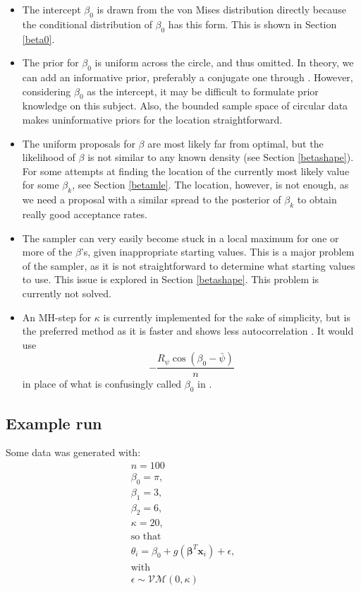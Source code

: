 \documentclass{article}\usepackage[]{graphicx}\usepackage[]{color}
\begin{document}
\begin{itemize}
\item The intercept $\beta_0$ is drawn from the von Mises distribution directly because the conditional distribution of $\beta_0$ has this form. This is shown in Section \ref{beta0}.
\item The prior for $\beta_0$ is uniform across the circle, and thus omitted. In theory, we can add an informative prior, preferably a conjugate one through \citet{guttorp1988finding}. However, considering $\beta_0$ as the intercept, it may be difficult to formulate prior knowledge on this subject. Also, the bounded sample space of circular data makes uninformative priors for the location straightforward.
\item The uniform proposals for $\beta$ are most likely far from optimal, but the likelihood of $\beta$ is not similar to any known density (see Section \ref{betashape}). For some attempts at finding the location of the currently most likely value for some $\beta_k$, see Section \ref{betamle}. The location, however, is not enough, as we need a proposal with a similar spread to the posterior of $\beta_k$ to obtain really good acceptance rates.
\item The sampler can very easily become stuck in a local maximum for one or more of the $\beta$'s, given inappropriate starting values. This is a major problem of the sampler, as it is not straightforward to determine what starting values to use. This issue is explored in Section \ref{betashape}. This problem is currently not solved.
\item An MH-step for $\kappa$ is currently implemented for the sake of simplicity, but \citet{forbes2014fast} is the preferred method as it is faster and shows less autocorrelation \citep{mulder2014extending}. It would use $$ - \frac{R_\psi \cos(\beta_0 - \bar\psi)}{n} $$ in place of what is confusingly called $\beta_0$ in \citet{forbes2014fast}.
\end{itemize}

\subsection{Example run}

Some data was generated with:
\begin{gather*}
n = 100 \\
\beta_0 = \pi, \\
\beta_1 = 3, \\
\beta_2 = 6, \\
\kappa = 20, \\
\text{so that} \\
\theta_i = \beta_0 + g(\boldsymbol\beta^T \boldsymbol{x}_i) + \epsilon, \\
\text{with} \\
\epsilon \sim \mathcal{VM}(0, \kappa)
\end{gather*}
\end{document}
